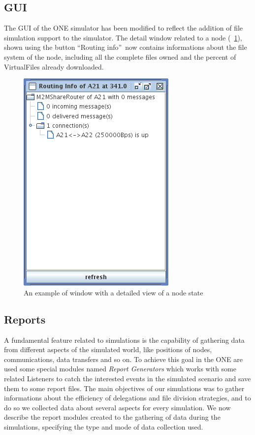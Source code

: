 \subsection{GUI}
The GUI of the ONE simulator has been modified to reflect the addition of file simulation support to the simulator. The detail window related to a node (\figurename~\ref{implRouting-Info}), shown using the button \textquotedblleft Routing info\textquotedblright \ now contains informations about the file system of the node, including all the complete files owned and the percent of VirtualFiles already downloaded. 
\begin{figure}[htpb]
  \begin{center}
    \includegraphics[scale=0.6]{5-simulatore/img/Routing-Info.png}
    \caption[Routing Info]{An example of window with a detailed view of a node state}    
    \label{implRouting-Info}
  \end{center}
\end{figure}

\subsection{Reports}
A fundamental feature related to simulations is the capability of gathering data from different aspects of the simulated world, like positions of nodes, communications, data transfers and so on. To achieve this goal in the ONE are used some special modules named \textit{Report Generators} which works with some related Listeners to catch the interested events in the simulated scenario and save them to some report files.
The main objectives of our simulations was to gather informations about the efficiency of delegations and file division strategies, and to do so we collected data about several aspects for every simulation. We now describe the report modules created to the gathering of data during the simulations, specifying the type and mode of data collection used.

